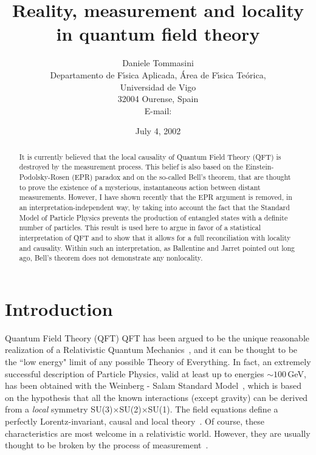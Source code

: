 \documentclass[12pt]{article}
\date{July 4, 2002}
\begin{document}
\title{Reality, measurement and locality in quantum field theory}

\author{Daniele Tommasini\\ 
Departamento de F\'\i sica Aplicada,
\'Area de F\'\i sica Te\'orica,\\ Universidad de Vigo\\ 
32004 Ourense, Spain\\ 
E-mail: }

\maketitle

\begin{abstract}
It is currently believed that the local causality of Quantum
Field Theory (QFT) is destroyed by the measurement process. This
belief is also based on the Einstein-Podolsky-Rosen (EPR) paradox and
on the so-called Bell's theorem, that are thought to prove the
existence of a mysterious, instantaneous action between distant
measurements. However, I have shown recently that the EPR argument is
removed, in an interpretation-independent way, by taking into account
the fact that the Standard Model of Particle Physics prevents the
production of entangled states with a definite number of
particles. This result is used here to argue in favor of a statistical
interpretation of QFT and to show that it allows for a full
reconciliation with locality and causality. Within such an
interpretation, as Ballentine and Jarret pointed out long ago, Bell's
theorem does not demonstrate any nonlocality.
\end{abstract}


\newpage

\section{Introduction} 

Quantum Field Theory (QFT) QFT has been argued to be the unique
reasonable realization of a Relativistic Quantum
Mechanics~\cite{WeinbookI}, and it can be thought to be the ``low
energy" limit of any possible Theory of Everything. In fact, an
extremely successful description of Particle Physics, valid at least
up to energies $\sim100$\,GeV, has been obtained with the Weinberg -
Salam Standard Model~\cite{WeinbookII}, which is based on the
hypothesis that all the known interactions (except gravity) can be
derived from a \emph{local} symmetry
SU(3)$\times$SU(2)$\times$SU(1). The field equations define a
perfectly Lorentz-invariant, causal and local
theory~\cite{WeinbookI,WeinbookII}. Of course, these characteristics
are most welcome in a relativistic world. However, they are usually
thought to be broken by the process of
measurement~\cite{measrel,measloca,Zeilinger,Laloe,Scarani}.
\end{document}
